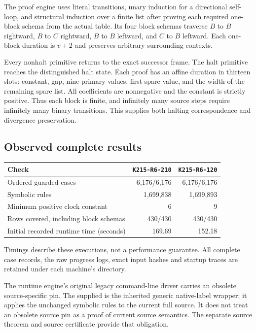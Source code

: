 \documentclass[11pt,a4paper]{article}
\theoremstyle{remark}\newtheorem{remark}[theorem]{Remark}
\newcommand{\file}[1]{\path{#1}}
\newcommand{\rhoa}{\texttt{K215-R6-210}}
\newcommand{\rhob}{\texttt{K215-R6-120}}
\begin{document}
The proof engine uses literal transitions, unary induction for a
directional self-loop, and structural induction over a finite list
after proving each required one-block schema from the actual table.
Its four block schemas traverse $B$ to $B$ rightward, $B$ to $C$
rightward, $B$ to $B$ leftward, and $C$ to $B$ leftward. Each one-block
duration is $v+2$ and preserves arbitrary surrounding contexts.

Every nonhalt primitive returns to the exact successor frame.
The halt primitive reaches the distinguished halt state. Each proof
has an affine duration in thirteen slots: constant, gap, nine
primary values, first-spare value, and the width of the remaining
spare list. All coefficients are nonnegative and the constant is
strictly positive. Thus each block is finite, and infinitely many
source steps require infinitely many binary transitions.
This supplies both halting correspondence and divergence preservation.

\subsection{Observed complete results}

\begin{center}
\begin{tabular}{@{}lrr@{}}
\toprule
Check & \rhoa & \rhob\\
\midrule
Ordered guarded cases & 6,176/6,176 & 6,176/6,176\\
Symbolic rules & 1,699,838 & 1,699,893\\
Minimum positive clock constant & 6 & 9\\
Rows covered, including block schemas & 430/430 & 430/430\\
Initial recorded runtime time (seconds) & 169.69 & 152.18\\
\bottomrule
\end{tabular}
\end{center}
Timings describe these executions, not a performance guarantee.
All complete case records, the raw progress logs, exact input hashes
and startup traces are retained under each machine's directory.

The runtime engine's original legacy command-line driver carries an
obsolete source-specific pin. The supplied
\file{code/runtime-inputs/validate_native.py} is the inherited generic
native-label wrapper; it applies the unchanged symbolic rules to the
current full source. It does not treat an obsolete source pin as a
proof of current source semantics. The separate source theorem and
source certificate provide that obligation.
\end{document}
